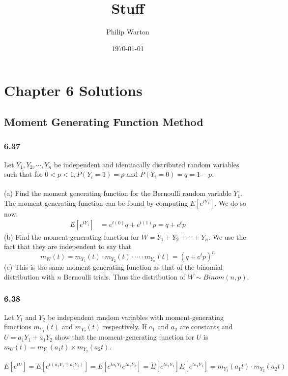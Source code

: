 \documentclass{article}
\theoremstyle{definition}
\begin{document}
\title{Stuff}
\author{Philip Warton}
\date{\today}
\maketitle
\section{Chapter 6 Solutions}
\subsection*{Moment Generating Function Method}
\subsubsection*{6.37}
Let $Y_1, Y_2, \cdots ,Y_n$ be independent and identiacally distributed 
random variables such that for $0 < p < 1, P(Y_i = 1) = p$ and $P(Y_i = 0) = q = 1-p$.\\\\
(a) Find the moment generating function for the Bernoulli random variable $Y_1$.
The moment generating function can be found by computing $E[e^{tY_1}]$. We do so now:
\begin{align*}
    E[e^{tY_1}] & = e^{t(0)} q + e^{t(1)} p
    = q + e^t p
\end{align*}
(b) Find the moment-generating function for $W = Y_1 + Y_2 + \cdots + Y_n$.
We use the fact that they are independent to say that
\[
    m_W(t) = m_{Y_1}(t) \cdot m_{Y_2}(t) \cdot \cdots \cdot m_{Y_n}(t) = (q + e^t p)^n
\]
(c) This is the same moment generating function as that of the binomial distribution with $n$ Bernoulli trials.
Thus the distribution of $W \sim Binom(n,p)$.
\subsubsection*{6.38}
Let $Y_1$ and $Y_2$ be independent random variables with moment-generating functions
$m_{Y_1}(t)$ and $m_{Y_2}(t)$ respectively. If $a_1$ and $a_2$ are constants and $U = a_1Y_1 + a_1Y_2$ show that the 
moment-generating function for $U$ is $m_U(t) = m_{Y_1}(a_1 t) \times m_{Y_2}(a_2 t)$.\\\\
\[
    E[e^{tU}] = E[e^{t(a_1Y_1 + a_2Y_2)}] = E[e^{ta_1Y_1}e^{ta_2Y_2}] = E[e^{ta_1Y_1}]E[e^{ta_1Y_1}] = m_{Y_1}(a_1t) \cdot m_{Y_2}(a_2t)
\]
\end{document}
